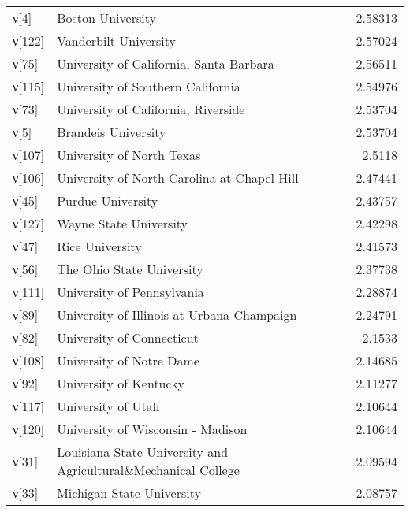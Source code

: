 \begin{tabular}{llr}
 ν[4]   & Boston University                                              &  2.58313  \\
 ν[122] & Vanderbilt University                                          &  2.57024  \\
 ν[75]  & University of California, Santa Barbara                        &  2.56511  \\
 ν[115] & University of Southern California                              &  2.54976  \\
 ν[73]  & University of California, Riverside                            &  2.53704  \\
 ν[5]   & Brandeis University                                            &  2.53704  \\
 ν[107] & University of North Texas                                      &  2.5118   \\
 ν[106] & University of North Carolina at Chapel Hill                    &  2.47441  \\
 ν[45]  & Purdue University                                              &  2.43757  \\
 ν[127] & Wayne State University                                         &  2.42298  \\
 ν[47]  & Rice University                                                &  2.41573  \\
 ν[56]  & The Ohio State University                                      &  2.37738  \\
 ν[111] & University of Pennsylvania                                     &  2.28874  \\
 ν[89]  & University of Illinois at Urbana-Champaign                     &  2.24791  \\
 ν[82]  & University of Connecticut                                      &  2.1533   \\
 ν[108] & University of Notre Dame                                       &  2.14685  \\
 ν[92]  & University of Kentucky                                         &  2.11277  \\
 ν[117] & University of Utah                                             &  2.10644  \\
 ν[120] & University of Wisconsin - Madison                              &  2.10644  \\
 ν[31]  & Louisiana State University and Agricultural\&Mechanical College &  2.09594  \\
 ν[33]  & Michigan State University                                      &  2.08757  \\

\end{tabular}
